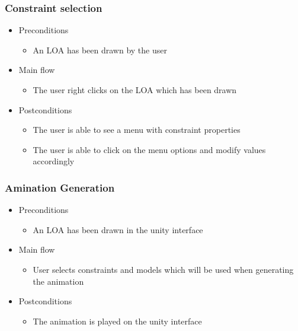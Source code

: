 \subsubsection{Constraint selection}
    \begin{itemize}
    \item Preconditions
        \begin{itemize}
            \item An LOA has been drawn by the user
        \end{itemize}
    \end{itemize}
    \begin{itemize}
        \item Main flow
        \begin{itemize}
            \item The user right clicks on the LOA which has been drawn
        \end{itemize}
    \end{itemize}
    \begin{itemize}
        \item Postconditions
        \begin{itemize}
            \item The user is able to see a menu with constraint properties
            \item The user is able to click on the menu options and modify values accordingly
        \end{itemize}
    \end{itemize}

\subsubsection{Amination Generation}
    \begin{itemize}
    \item Preconditions
        \begin{itemize}
            \item An LOA has been drawn in the unity interface
        \end{itemize}
    \end{itemize}
    \begin{itemize}
        \item Main flow
        \begin{itemize}
            \item User selects constraints and models which will be used when generating the animation
        \end{itemize}
    \end{itemize}
    \begin{itemize}
        \item Postconditions
        \begin{itemize}
            \item The animation is played on the unity interface
        \end{itemize}
    \end{itemize}

